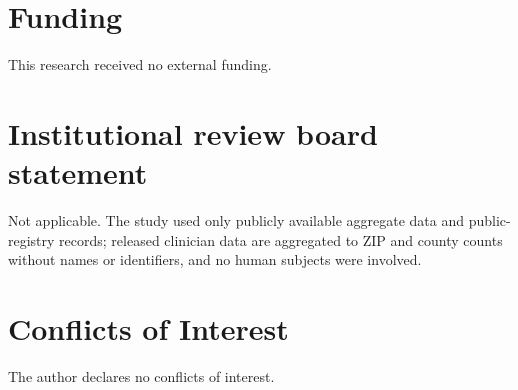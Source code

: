\documentclass[10pt,twocolumn,letterpaper]{article}
\begin{document}
\section*{Funding}
\noindent This research received no external funding.

\section*{Institutional review board statement}
\noindent Not applicable. The study used only publicly available aggregate data and public-registry records; released clinician data are aggregated to ZIP and county counts without names or identifiers, and no human subjects were involved.

\section*{Conflicts of Interest}
\noindent The author declares no conflicts of interest.
\end{document}

